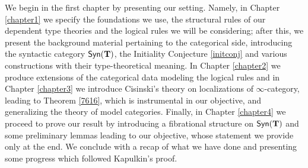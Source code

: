 \begin{defn}
  We begin in the first chapter by presenting our setting. Namely, in
  Chapter \ref{chapter1} we specify the foundations we use, the structural rules of our
  dependent type theories and the logical rules we will be considering; after
  this, we present the background material pertaining to the categorical side,
  introducing the syntactic category $\mathsf{Syn}(\mathbf{T})$, the Initiality Conjecture
  \ref{initconj} and various constructions
  with their type-theoretical meaning. In Chapter \ref{chapter2} we produce
  extensions of the categorical data modeling the logical rules and in Chapter
  \ref{chapter3} we introduce Cisinski's theory on localizations of
  $\infty$-category, leading to Theorem \ref{7616}, which is instrumental in our
  objective, and generalizing the theory of model categories. Finally, in
  Chapter \ref{chapter4} we proceed to prove our result by introducing a
  fibrational structure on $\mathsf{Syn}(\mathbf{T})$ and some preliminary lemmas leading to our
  objective, whose statement we provide only at the end. We conclude with a
  recap of what we have done and presenting some progress which followed
  Kapulkin's proof.
\end{defn}

